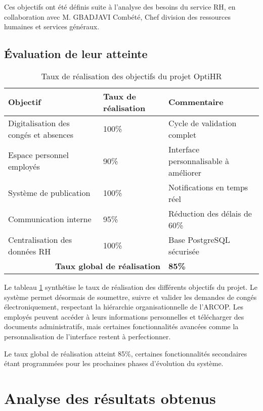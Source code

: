 Ces objectifs ont été définis suite à l'analyse des besoins du service RH, en collaboration avec M. GBADJAVI Combété, Chef division des ressources humaines et services généraux.

\subsection{Évaluation de leur atteinte}

\begin{table}[H]
\centering
\caption{Taux de réalisation des objectifs du projet OptiHR}
\label{tab:objectifs}
\begin{tabular}{|p{7cm}|p{3cm}|p{4cm}|}
\hline
\textbf{Objectif} & \textbf{Taux de réalisation} & \textbf{Commentaire} \\
\hline
Digitalisation des congés et absences & 100\% & Cycle de validation complet \\
\hline
Espace personnel employés & 90\% & Interface personnalisable à améliorer \\
\hline
Système de publication & 100\% & Notifications en temps réel \\
\hline
Communication interne & 95\% & Réduction des délais de 60\% \\
\hline
Centralisation des données RH & 100\% & Base PostgreSQL sécurisée \\
\hline
\multicolumn{2}{|r|}{\textbf{Taux global de réalisation}} & \textbf{85\%} \\
\hline
\end{tabular}
\end{table}

Le tableau \ref{tab:objectifs} synthétise le taux de réalisation des différents objectifs du projet. Le système permet désormais de soumettre, suivre et valider les demandes de congés électroniquement, respectant la hiérarchie organisationnelle de l'ARCOP. Les employés peuvent accéder à leurs informations personnelles et télécharger des documents administratifs, mais certaines fonctionnalités avancées comme la personnalisation de l'interface restent à perfectionner.

Le taux global de réalisation atteint 85\%, certaines fonctionnalités secondaires étant programmées pour les prochaines phases d'évolution du système.

\section{Analyse des résultats obtenus}

